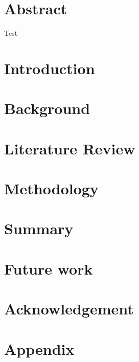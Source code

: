 \documentclass[twocolumn]{article}
\begin{document}
    \section*{Abstract}\label{sec:abstract}

    Test\cite{lol}

    \section{Introduction}\label{sec:introduction}
    

    \section{Background}\label{sec:background}
    

    \section{Literature Review}\label{sec:literature-review}
    

    \section{Methodology}\label{sec:methodology}
    

    \section{Summary}\label{sec:conclusion}
    

    \section{Future work}\label{sec:futurework}
    

    \section{Acknowledgement}\label{sec:acknowledgement}
    

    \printbibliography

    \onecolumn
    \appendix
    \section{Appendix}\label{sec:appendix}
    
\end{document}
